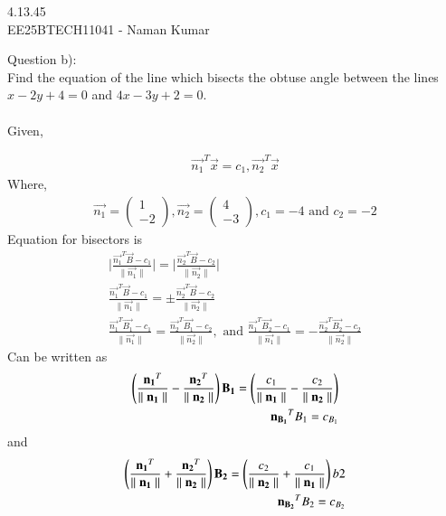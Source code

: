 \documentclass[journal]{IEEEtran}
\author{EE25BTECH11041-Naman Kumar }
\begin{document}
\begin{center}
    \huge{4.13.45}\\
    \large{EE25BTECH11041 - Naman Kumar}
\end{center}
Question b):\\
Find the equation of the line which bisects the obtuse angle between the lines
$x -2y + 4 = 0$ and $4x - 3y + 2 = 0$.\\
\solution \\
Given,

\begin{align}
\vec{n_1}^T\vec{x}=c_1,\vec{n_2}^T\vec{x}
\end{align}
Where,
\begin{align}
\vec{n_1}=\begin{pmatrix}1\\-2\end{pmatrix},\vec{n_2}=\begin{pmatrix}4\\-3\end{pmatrix},c_1=-4\text{ and }c_2=-2
\end{align}
Equation for bisectors is
\begin{align}
    \lvert\frac{\vec{n_1}^T\vec{B}-c_1}{\parallel\vec{n_1}\parallel}\rvert=\lvert\frac{\vec{n_2}^T\vec{B}-c_2}{\parallel\vec{n_2}\parallel}\rvert\\
    \frac{\vec{n_1}^T\vec{B}-c_1}{\parallel\vec{n_1}\parallel}=\pm \frac{\vec{n_2}^T\vec{B}-c_2}{\parallel\vec{n_2}\parallel}\\
    \frac{\vec{n_1}^T\vec{B_1}-c_1}{\parallel\vec{n_1}\parallel}=\frac{\vec{n_2}^T\vec{B_1}-c_2}{\parallel\vec{n_2}\parallel},\text{ and }\frac{\vec{n_1}^T\vec{B_2}-c_1}{\parallel\vec{n_1}\parallel}=-\frac{\vec{n_2}^T\vec{B_2}-c_2}{\parallel\vec{n_2}\parallel}
\end{align}
Can be written as
\begin{align}
    \left(\frac{\mathbf{n_1}^T}{\parallel\mathbf{n_1}\parallel} - \frac{\mathbf{n_2}^T}{\parallel\mathbf{n_2}\parallel}\right)\mathbf{B_1}=\left(\frac{c_1}{\parallel\mathbf{n_1}\parallel} - \frac{c_2}{\parallel\mathbf{n_2}\parallel}\right)\label{b1} \\
    \mathbf{n_{B_1}}^TB_1=c_{B_1} \label{b1}
\end{align}
and
\begin{align}
    \left(\frac{\mathbf{n_1}^T}{\parallel\mathbf{n_1}\parallel} + \frac{\mathbf{n_2}^T}{\parallel\mathbf{n_2}\parallel}\right)\mathbf{B_2}=\left(\frac{c_2}{\parallel\mathbf{n_2}\parallel} + \frac{c_1}{\parallel\mathbf{n_1}\parallel}\right) {b2}\\
    \mathbf{n_{B_2}}^TB_2=c_{B_2} \label{b2}
\end{align}
\end{document}
